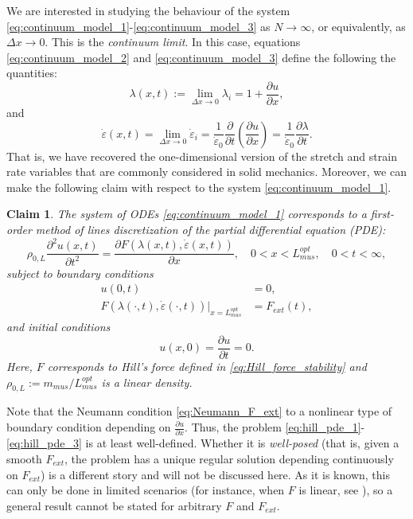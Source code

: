 \documentclass{sfuthesis}
\numberwithin{equation}{section}
\numberwithin{figure}{chapter}
\numberwithin{table}{chapter}
\newtheorem{claim}[theorem]{Claim}
\theoremstyle{definition}
\newcommand{\pder}[2]{\dfrac{\partial #1}{\partial #2}}
\newcommand{\depsilon}{\dot{\varepsilon}}
\begin{document}
We are interested in studying the behaviour of the system \eqref{eq:continuum_model_1}-\eqref{eq:continuum_model_3} as $N \to \infty$, or equivalently, as $\Delta x \to 0$. This is the \textit{continuum limit}. In this case, equations \eqref{eq:continuum_model_2} and \eqref{eq:continuum_model_3} define the following the quantities:
\begin{equation}
    \lambda(x,t) := \lim_{\Delta x \to 0} \lambda_i = 1 + \pder{u}{x},
\end{equation}
and
\begin{equation}
    \depsilon(x,t) = \lim_{\Delta x \to 0} \depsilon_i = \dfrac{1}{\depsilon_0} \pder{}{t}\left(\pder{u}{x} \right) = \dfrac{1}{\depsilon_0} \pder{\lambda}{t}.
\end{equation}
That is, we have recovered the one-dimensional version of the stretch and strain rate variables that are commonly considered in solid mechanics. Moreover, we can make the following claim with respect to the system \eqref{eq:continuum_model_1}.

\begin{claim} \label{cl:hill_pde}
The system of ODEs \eqref{eq:continuum_model_1} corresponds to a first-order method of lines discretization of the partial differential equation (PDE):
\begin{equation} \label{eq:hill_pde_1}
    \rho_{0,L} \pder{^2 u(x,t)}{t^2}  = \pder{F(\lambda(x,t),\depsilon(x,t))}{x}, \quad 0 < x < L_{mus}^{opt}, \quad 0 < t < \infty,
\end{equation}
subject to boundary conditions
\begin{subequations} \label{eq:hill_pde_2}
    \begin{align}
        u(0,t) &= 0, \\
        F(\lambda(\cdot, t),\depsilon (\cdot, t))\Big|_{x=L_{mus}^{opt}} &= F_{ext}(t), \label{eq:Neumann_F_ext}
    \end{align}
\end{subequations}
and initial conditions
\begin{equation} \label{eq:hill_pde_3}
    u(x,0) = \pder{u}{t} = 0.
\end{equation}
Here, $F$ corresponds to Hill's force defined in \eqref{eq:Hill_force_stability} and $\rho_{0,L} := m_{mus}/L_{mus}^{opt}$ is a linear density.
\end{claim}

Note that the Neumann condition \eqref{eq:Neumann_F_ext} to a nonlinear type of boundary condition depending on $\frac{\partial u}{\partial x}$. Thus, the problem \eqref{eq:hill_pde_1}-\eqref{eq:hill_pde_3} is at least well-defined. Whether it is \textit{well-posed} (that is, given a smooth $F_{ext}$, the problem has a unique regular solution depending continuously on $F_{ext}$) is a different story and will not be discussed here. As it is known, this can only be done in limited scenarios (for instance, when $F$ is linear, see \cite{TruesdellNoll2004}), so a general result cannot be stated for arbitrary $F$ and $F_{ext}$.
\end{document}
